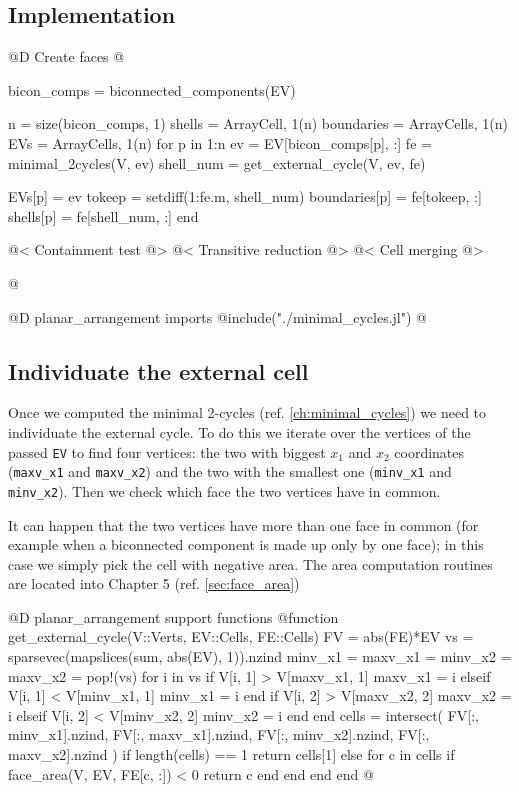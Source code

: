 \documentclass[10pt]{book}
\begin{document}
\subsection{Implementation}
@D Create faces
@{bicon_comps = biconnected_components(EV)

n = size(bicon_comps, 1)
shells = Array{Cell, 1}(n)
boundaries = Array{Cells, 1}(n)
EVs = Array{Cells, 1}(n)
for p in 1:n
    ev = EV[bicon_comps[p], :]
    fe = minimal_2cycles(V, ev)
    shell_num = get_external_cycle(V, ev, fe)

    EVs[p] = ev 
    tokeep = setdiff(1:fe.m, shell_num)
    boundaries[p] = fe[tokeep, :]
    shells[p] = fe[shell_num, :]
end

@< Containment test @>
@< Transitive reduction @>
@< Cell merging @>

@}

@D planar\_arrangement imports
@{include("./minimal_cycles.jl")
@}

\subsection{Individuate the external cell}
Once we computed the minimal 2-cycles (ref. \ref{ch:minimal_cycles})
we need to individuate the external cycle. To do this we iterate over the
vertices of the passed \texttt{EV} to find four vertices: the two with biggest
$x_1$ and $x_2$ coordinates (\texttt{maxv\_x1} and \texttt{maxv\_x2}) and the 
two with the smallest one (\texttt{minv\_x1} and \texttt{minv\_x2}). 
Then we check which face the two vertices have in common. 

It can happen that the two vertices have more than one face in common
(for example when a biconnected component is made up only by one face);
in this case we simply pick the cell with negative area. The area
computation routines are located into Chapter 5 (ref. \ref{sec:face_area})


@D planar\_arrangement support functions
@{function get_external_cycle(V::Verts, EV::Cells, FE::Cells)
    FV = abs(FE)*EV
    vs = sparsevec(mapslices(sum, abs(EV), 1)).nzind
    minv_x1 = maxv_x1 = minv_x2 = maxv_x2 = pop!(vs)
    for i in vs
        if V[i, 1] > V[maxv_x1, 1]
            maxv_x1 = i
        elseif V[i, 1] < V[minv_x1, 1]
            minv_x1 = i
        end
        if V[i, 2] > V[maxv_x2, 2]
            maxv_x2 = i
        elseif V[i, 2] < V[minv_x2, 2]
            minv_x2 = i
        end
    end
    cells = intersect(
        FV[:, minv_x1].nzind, 
        FV[:, maxv_x1].nzind,
        FV[:, minv_x2].nzind,
        FV[:, maxv_x2].nzind
    )
    if length(cells) == 1
        return cells[1]
    else
        for c in cells
            if face_area(V, EV, FE[c, :]) < 0
                return c
            end
        end
    end
end
@}
\end{document}
